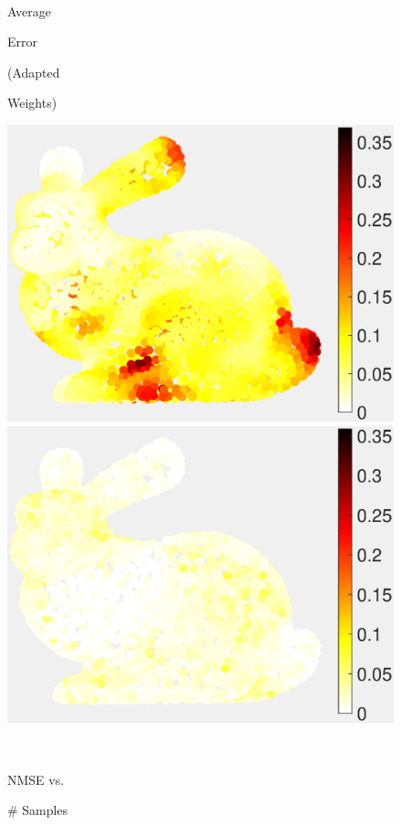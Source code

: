 \documentclass[journal, 10pt]{IEEEtran}
\begin{document}
\begin{figure}[H]
\begin{minipage}[m]{0.4\linewidth}
\end{minipage} \\
\begin{minipage}[m]{0.16\linewidth}
\centerline{\small{Average}}
\centerline{\small{Error}}
\centerline{\small{(Adapted}}
\centerline{\small{Weights)}}
\end{minipage}
\begin{minipage}[m]{0.4\linewidth}
\centerline{\includegraphics[width=.85\linewidth]{fig_rec_low_error_adapted}}
\end{minipage}
\begin{minipage}[m]{0.4\linewidth}
\centerline{\includegraphics[width=.85\linewidth]{fig_rec_band_error_adapted}}
\end{minipage} \\
\begin{minipage}[m]{0.16\linewidth}
\centerline{\small{NMSE vs.}}
\centerline{\small{\# Samples}}
\end{minipage} 

\end{figure}
\end{document}
